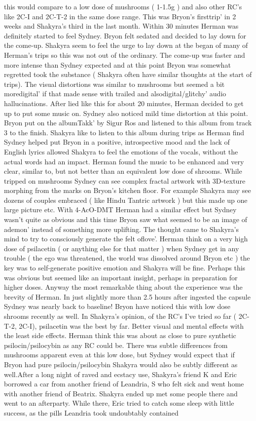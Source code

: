 \documentclass[12pt]{book}
\begin{document}
this would compare to a low dose of mushrooms ( 1-1.5g ) and also other RC's like 2C-I and 2C-T-2 in the same dose range. This was Bryon's firsttrip' in 2 weeks and Shakyra's third in the last month. Within 30 minutes Herman was definitely started to feel Sydney. Bryon felt sedated and decided to lay down for the come-up. Shakyra seem to feel the urge to lay down at the began of many of Herman's trips so this was not out of the ordinary. The come-up was faster and more intense than Sydney expected and at this point Bryon was somewhat regretted took the substance ( Shakyra often have similar thoughts at the start of trips). The visual distortions was similar to mushrooms but seemed a bit moredigital' if that made sense with trailed and alsodigital/glitchy' audio hallucinations. After lied like this for about 20 minutes, Herman decided to get up to put some music on. Sydney also noticed mild time distortion at this point. Bryon put on the albumTakk' by Sigur Ros and listened to this album from track 3 to the finish. Shakyra like to listen to this album during trips as Herman find Sydney helped put Bryon in a positive, introspective mood and the lack of English lyrics allowed Shakyra to feel the emotions of the vocals, without the actual words had an impact. Herman found the music to be enhanced and very clear, similar to, but not better than an equivalent low dose of shrooms. While tripped on mushrooms Sydney can see complex fractal artwork with 3D-texture morphing from the marks on Bryon's kitchen floor. For example Shakyra may see dozens of couples embraced ( like Hindu Tantric artwork ) but this made up one large picture etc. With 4-AcO-DMT Herman had a similar effect but Sydney wasn't quite as obvious and this time Bryon saw what seemed to be an image of ademon' instead of something more uplifting. The thought came to Shakyra's mind to try to consciously generate the felt oflove'. Herman think on a very high dose of psilacetin ( or anything else for that matter ) when Sydney get in any trouble ( the ego was threatened, the world was dissolved around Bryon etc ) the key was to self-generate positive emotion and Shakyra will be fine. Perhaps this was obvious but seemed like an important insight, perhaps in preparation for higher doses. Anyway the most remarkable thing about the experience was the brevity of Herman. In just slightly more than 2.5 hours after ingested the capsule Sydney was nearly back to baseline! Bryon have noticed this with low dose shrooms recently as well. In Shakyra's opinion, of the RC's I've tried so far ( 2C-T-2, 2C-I), psilacetin was the best by far. Better visual and mental effects with the least side effects. Herman think this was about as close to pure synthetic psilocin/psilocybin as any RC could be. There was subtle differences from mushrooms apparent even at this low dose, but Sydney would expect that if Bryon had pure psilocin/psilocybin Shakyra would also be subtly different as well.After a long night of raved and ecstacy use, Shakyra's friend K and Eric borrowed a car from another friend of Leandria, S who felt sick and went home with another friend of Beatrix. Shakyra ended up met some people there and went to an afterparty. While there, Eric tried to catch some sleep with little success, as the pills Leandria took undoubtably contained 
\end{document}
